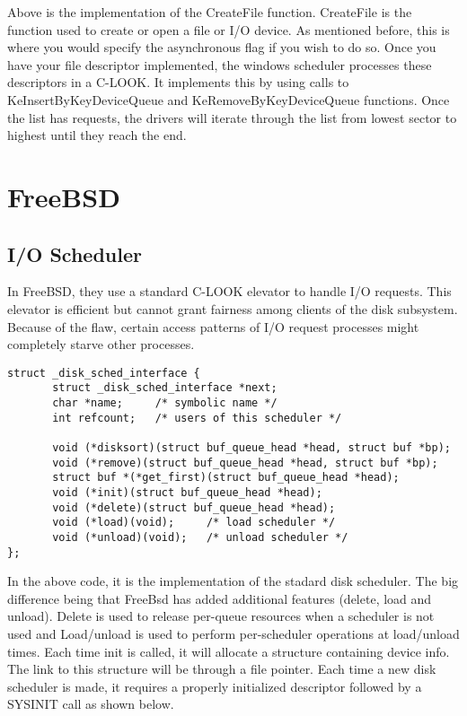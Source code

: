 \documentclass[letterpaper,10pt,titlepage,draftclsnofoot,onecolumn]{IEEEtran}
\begin{document}
Above is the implementation of the CreateFile function. CreateFile is the function used to create or open a file or I/O device. As mentioned before, this is where you would specify the asynchronous flag if you wish to do so. Once you have your file descriptor implemented, the windows scheduler processes these descriptors in a C-LOOK. It implements this by using calls to KeInsertByKeyDeviceQueue and KeRemoveByKeyDeviceQueue functions. Once the list has requests, the drivers will iterate through the list from lowest sector to highest until they reach the end. 

\section{FreeBSD}

\subsection{I/O Scheduler}
In FreeBSD, they use a standard C-LOOK elevator to handle I/O requests. This elevator is efficient but cannot grant fairness among clients of the disk subsystem. Because of the flaw, certain access patterns of I/O request processes might completely starve other processes. \cite{FreeBSD}  

\begin{lstlisting}
struct _disk_sched_interface {
       struct _disk_sched_interface *next;
       char *name;     /* symbolic name */
       int refcount;   /* users of this scheduler */

       void (*disksort)(struct buf_queue_head *head, struct buf *bp);
       void (*remove)(struct buf_queue_head *head, struct buf *bp);
       struct buf *(*get_first)(struct buf_queue_head *head);
       void (*init)(struct buf_queue_head *head);
       void (*delete)(struct buf_queue_head *head);
       void (*load)(void);     /* load scheduler */
       void (*unload)(void);   /* unload scheduler */
};
\end{lstlisting}\cite{FreeBSD2} 

In the above code, it is the implementation of the stadard disk scheduler. The big difference being that FreeBsd has added additional features (delete, load and unload). Delete is used to release per-queue resources when a scheduler is not used and Load/unload is used to perform per-scheduler operations at load/unload times. Each time init is called, it will allocate a structure containing device info. The link to this structure will be through a file pointer. Each time a new disk scheduler is made, it requires a properly initialized descriptor followed by a SYSINIT call as shown below. \cite{FreeBSD2} 
\end{document}
